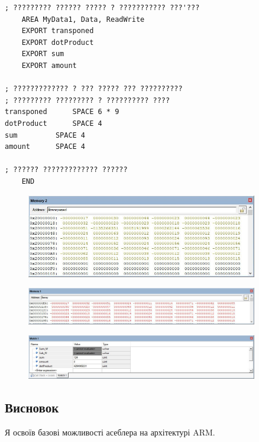 \documentclass[12pt]{extarticle}
\begin{document}
\begin{verbatim}
; ????????? ?????? ????? ? ??????????? ???'???
	AREA MyData1, Data, ReadWrite
	EXPORT transponed
	EXPORT dotProduct
	EXPORT sum
	EXPORT amount

; ????????????? ? ??? ????? ??? ??????????
; ????????? ????????? ? ?????????? ????
transponed 		SPACE 6 * 9
dotProduct		SPACE 4
sum			SPACE 4
amount		SPACE 4

; ?????? ????????????? ??????
	END

\end{verbatim}

\vspace{12pt}
\begin{figure}[H]
    \centering
    \includegraphics[width=0.90\textwidth]{array.jpg}
    \caption{}
\end{figure}

\vspace{12pt}
\begin{figure}[H]
    \centering
    \includegraphics[width=0.90\textwidth]{transponed.jpg}
    \caption{}
\end{figure}

\vspace{12pt}
\begin{figure}[H]
    \centering
    \includegraphics[width=0.90\textwidth]{vars.jpg}
    \caption{}
\end{figure}

\vspace{12pt}

\subsection*{Висновок} 
Я освоїв базові можливості асеблера на архітектурі ARM.
\end{document}
